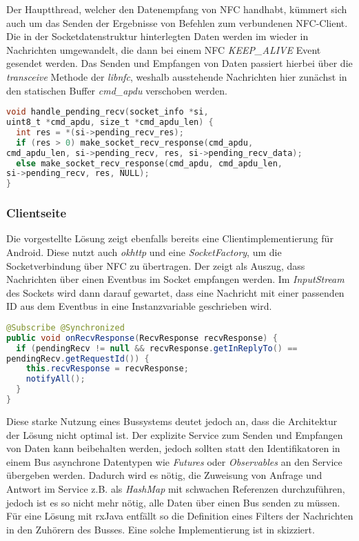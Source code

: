 	    Der Hauptthread, welcher den Datenempfang von NFC handhabt, kümmert sich auch um das Senden der Ergebnisse von Befehlen zum verbundenen NFC-Client. Die in der Socketdatenstruktur hinterlegten Daten werden im  wieder in Nachrichten umgewandelt, die dann bei einem NFC {\it KEEP\_ALIVE} Event gesendet werden. Das Senden und Empfangen von Daten passiert hierbei über die {\it transceive} Methode der {\it libnfc}, weshalb ausstehende Nachrichten hier zunächst in den statischen Buffer {\it cmd\_apdu} verschoben werden.
	    \begin{lstlisting}[frame=bt, label={lst:nfc:recvPending}, language=C, caption=Senden von Daten über NFC (Servercode in C) \cite{nfcSockets}]
void handle_pending_recv(socket_info *si,
uint8_t *cmd_apdu, size_t *cmd_apdu_len) {
  int res = *(si->pending_recv_res);
  if (res > 0) make_socket_recv_response(cmd_apdu,
cmd_apdu_len, si->pending_recv, res, si->pending_recv_data);
  else make_socket_recv_response(cmd_apdu, cmd_apdu_len,
si->pending_recv, res, NULL);
}
        \end{lstlisting}	    
	\subsubsection{Clientseite}
	    Die vorgestellte Lösung zeigt ebenfalls bereits eine Clientimplementierung für Android. Diese nutzt auch {\it okhttp} und eine {\it SocketFactory}, um die Socketverbindung über NFC zu übertragen.
        Der  zeigt als Auszug, dass Nachrichten über einen Eventbus im Socket empfangen werden. Im {\it InputStream} des Sockets wird dann darauf gewartet, dass eine Nachricht mit einer passenden ID aus dem Eventbus in eine Instanzvariable geschrieben wird.
        
        \begin{lstlisting}[frame=bt, label={lst:nfc:apdu}, language=Java, caption=Datenempfang über NFC (Clientcode in Java) \cite{nfcSocketsClient}]
@Subscribe @Synchronized
public void onRecvResponse(RecvResponse recvResponse) {
  if (pendingRecv != null && recvResponse.getInReplyTo() ==
pendingRecv.getRequestId()) {
    this.recvResponse = recvResponse;
    notifyAll();
  }
}
        \end{lstlisting}         
        
        Diese starke Nutzung eines Bussystems deutet jedoch an, dass die Architektur der Lösung nicht optimal ist. Der explizite Service zum Senden und Empfangen von Daten kann beibehalten werden, jedoch sollten statt den Identifikatoren in einem Bus asynchrone Datentypen wie {\it Futures} oder {\it Observables} an den Service übergeben werden. Dadurch wird es nötig, die Zuweisung von Anfrage und Antwort im Service z.B. als {\it HashMap} mit schwachen Referenzen durchzuführen, jedoch ist es so nicht mehr nötig, alle Daten über einen Bus senden zu müssen. Für eine Lösung mit rxJava entfällt so die Definition eines Filters der Nachrichten in den Zuhörern des Busses. Eine solche Implementierung ist in  skizziert.
        
